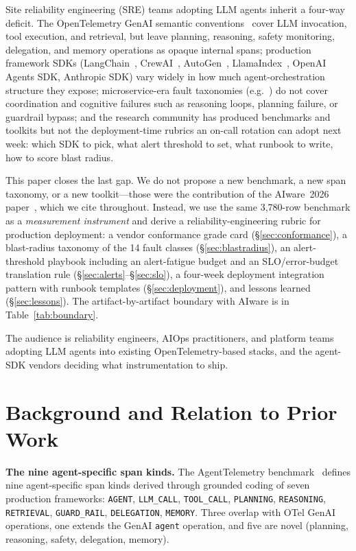 \documentclass[conference]{IEEEtran}
\begin{document}
Site reliability engineering (SRE) teams adopting LLM agents inherit
a four-way deficit. The OpenTelemetry GenAI semantic
conventions~\cite{otel_genai} cover LLM invocation, tool execution,
and retrieval, but leave planning, reasoning, safety monitoring,
delegation, and memory operations as opaque internal spans;
production framework SDKs (LangChain~\cite{langchain},
CrewAI~\cite{crewai}, AutoGen~\cite{autogen},
LlamaIndex~\cite{llamaindex}, OpenAI Agents SDK, Anthropic SDK)
vary widely in how much agent-orchestration structure they expose;
microservice-era fault taxonomies (e.g.~\cite{cusick_orr,nicsdg}) do
not cover coordination and cognitive failures such as reasoning
loops, planning failure, or guardrail bypass; and the research
community has produced benchmarks and toolkits but not the
deployment-time rubrics an on-call rotation can adopt next week:
which SDK to pick, what alert threshold to set, what runbook to
write, how to score blast radius.

This paper closes the last gap. We do not propose a new benchmark, a
new span taxonomy, or a new toolkit---those were the contribution of
the AIware~2026 paper~\cite{agenttelemetry_aiware}, which we cite
throughout. Instead, we use the same 3{,}780-row benchmark as a
\emph{measurement instrument} and derive a reliability-engineering
rubric for production deployment: a vendor conformance grade card
(\S\ref{sec:conformance}), a blast-radius taxonomy of the 14 fault
classes (\S\ref{sec:blastradius}), an alert-threshold playbook
including an alert-fatigue budget and an SLO/error-budget translation
rule (\S\ref{sec:alerts}--\S\ref{sec:slo}), a four-week deployment
integration pattern with runbook templates (\S\ref{sec:deployment}),
and lessons learned (\S\ref{sec:lessons}). The artifact-by-artifact
boundary with AIware is in Table~\ref{tab:boundary}.

The audience is reliability engineers, AIOps practitioners, and
platform teams adopting LLM agents into existing
OpenTelemetry-based stacks, and the agent-SDK vendors deciding what
instrumentation to ship.

\section{Background and Relation to Prior Work}
\label{sec:background}

\textbf{The nine agent-specific span kinds.}
The AgentTelemetry benchmark~\cite{agenttelemetry_aiware} defines nine
agent-specific span kinds derived through grounded coding of seven
production frameworks: \texttt{AGENT}, \texttt{LLM\_CALL},
\texttt{TOOL\_CALL}, \texttt{PLANNING}, \texttt{REASONING},
\texttt{RETRIEVAL}, \texttt{GUARD\_RAIL}, \texttt{DELEGATION},
\texttt{MEMORY}. Three overlap with OTel GenAI operations, one
extends the GenAI \texttt{agent} operation, and five are novel
(planning, reasoning, safety, delegation, memory).
\end{document}
